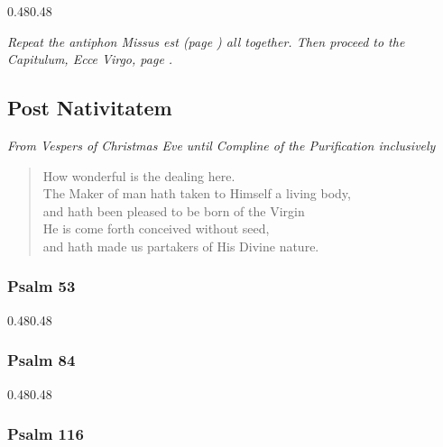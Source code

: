 \documentclass[12pt,a5paper]{memoir}
\newcommand{\rubrics}[1]{\noindent\textit{#1}}
\newcommand{\setupParallel}{\begin{Parallel}{0.48\textwidth}{0.48\textwidth}}
\begin{document}

\setupParallel

\end{Parallel}

\bigskip

\rubrics{Repeat the antiphon \emph{Missus est} (page \pageref{missusest}) all together.  Then proceed to the Capitulum, \emph{Ecce Virgo}, page \pageref{primechapteradvent}. }


\subsection*{Post Nativitatem}

\rubrics{From Vespers of Christmas Eve until Compline of the Purification inclusively}

\label{oadmirabile}

\begin{verse}
How wonderful is the dealing here.\\
The Maker of man hath taken to Himself a living body,\\
and hath been pleased to be born of the Virgin\\
He is come forth conceived without seed,\\
and hath made us partakers of His Divine nature.
\end{verse}

\subsubsection*{Psalm 53}


\setupParallel

\end{Parallel}

\subsubsection*{Psalm 84}


\setupParallel

\end{Parallel}



\subsubsection*{Psalm 116}
\end{document}

